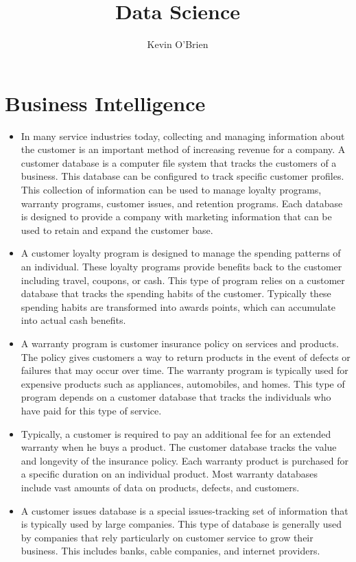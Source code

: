 \documentclass[12pt]{article}
\title{Data Science}
\author{Kevin O'Brien}
\begin{document}
\section*{Business Intelligence}
	
\begin{itemize}
\item In many service industries today, collecting and managing information about the customer is an important method of increasing revenue for a company. A customer database is a computer file system that tracks the customers of a business. This database can be configured to track specific customer profiles. This collection of information can be used to manage loyalty programs, warranty programs, customer issues, and retention programs. Each database is designed to provide a company with marketing information that can be used to retain and expand the customer base.

 

\item A customer loyalty program is designed to manage the spending patterns of an individual. These loyalty programs provide benefits back to the customer including travel, coupons, or cash. This type of program relies on a customer database that tracks the spending habits of the customer. Typically these spending habits are transformed into awards points, which can accumulate into actual cash benefits.

 

\item A warranty program is customer insurance policy on services and products. The policy gives customers a way to return products in the event of defects or failures that may occur over time. The warranty program is typically used for expensive products such as appliances, automobiles, and homes. This type of program depends on a customer database that tracks the individuals who have paid for this type of service.

 
\item Typically, a customer is required to pay an additional fee for an extended warranty when he buys a product. The customer database tracks the value and longevity of the insurance policy. Each warranty product is purchased for a specific duration on an individual product. Most warranty databases include vast amounts of data on products, defects, and customers.

\item A customer issues database is a special issues-tracking set of information that is typically used by large companies. This type of database is generally used by companies that rely particularly on customer service to grow their business. This includes banks, cable companies, and internet providers.


\end{itemize}
\end{document}
